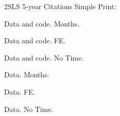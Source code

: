\documentclass{beamer}
\begin{document}
\begin{frame}{}
\scalebox{0.3}{}
\end{frame}

\begin{frame}{}
\scalebox{0.3}{}
\end{frame}


\begin{frame}{}
\scalebox{0.3}{}
\end{frame}

\begin{frame}{}
\scalebox{0.3}{}
\end{frame}

\begin{frame}{}
\scalebox{0.3}{}
\end{frame}

\begin{frame}{}
\scalebox{0.3}{}
\end{frame}

\begin{frame}{2SLS 5-year Citations}
Simple Print:

Data and code. Months.

Data and code. FE.


Data and code. No Time.

Data. Months.

Data. FE.

Data. No Time.
\end{frame}

\begin{frame}{}
\scalebox{0.3}{}
\end{frame}

\begin{frame}{}
\scalebox{0.3}{}
\end{frame}

\begin{frame}{}
\scalebox{0.3}{}
\end{frame}

\begin{frame}{}
\scalebox{0.3}{}
\end{frame}
\end{document}
